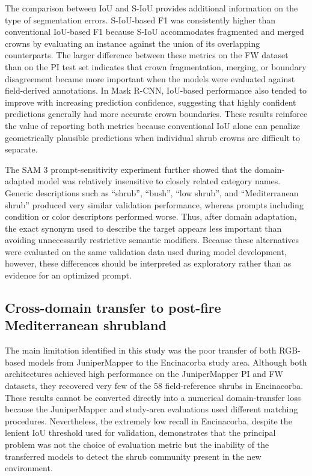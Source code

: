 \documentclass[12pt,a4paper]{article}
\begin{document}
The comparison between IoU and S-IoU provides additional information on the type of segmentation errors. S-IoU-based F1 was consistently higher than conventional IoU-based F1 because S-IoU accommodates fragmented and merged crowns by evaluating an instance against the union of its overlapping counterparts. The larger difference between these metrics on the FW dataset than on the PI test set indicates that crown fragmentation, merging, or boundary disagreement became more important when the models were evaluated against field-derived annotations. In Mask R-CNN, IoU-based performance also tended to improve with increasing prediction confidence, suggesting that highly confident predictions generally had more accurate crown boundaries. These results reinforce the value of reporting both metrics because conventional IoU alone can penalize geometrically plausible predictions when individual shrub crowns are difficult to separate.

The SAM 3 prompt-sensitivity experiment further showed that the domain-adapted model was relatively insensitive to closely related category names. Generic descriptions such as ``shrub'', ``bush'', ``low shrub'', and ``Mediterranean shrub'' produced very similar validation performance, whereas prompts including condition or color descriptors performed worse. Thus, after domain adaptation, the exact synonym used to describe the target appears less important than avoiding unnecessarily restrictive semantic modifiers. Because these alternatives were evaluated on the same validation data used during model development, however, these differences should be interpreted as exploratory rather than as evidence for an optimized prompt.

\subsection{Cross-domain transfer to post-fire Mediterranean shrubland}

The main limitation identified in this study was the poor transfer of both RGB-based models from JuniperMapper to the Encinacorba study area. Although both architectures achieved high performance on the JuniperMapper PI and FW datasets, they recovered very few of the 58 field-reference shrubs in Encinacorba. These results cannot be converted directly into a numerical domain-transfer loss because the JuniperMapper and study-area evaluations used different matching procedures. Nevertheless, the extremely low recall in Encinacorba, despite the lenient IoU threshold used for validation, demonstrates that the principal problem was not the choice of evaluation metric but the inability of the transferred models to detect the shrub community present in the new environment.
\end{document}
